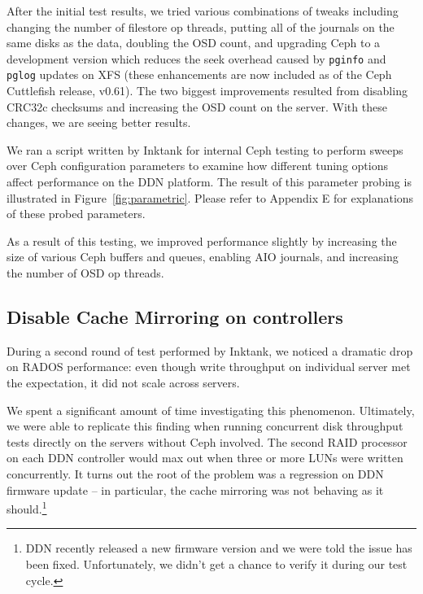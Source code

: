 \documentclass{article}
\begin{document}
After the initial test results, we tried various combinations of tweaks
including changing the number of filestore op threads, putting all of the
journals on the same disks as the data, doubling the OSD count, and upgrading
Ceph to a development version which reduces the seek overhead caused by
\texttt{pginfo} and \texttt{pglog} updates on XFS (these enhancements are now
included as of the Ceph Cuttlefish release, v0.61).  The two biggest
improvements resulted from disabling CRC32c checksums and increasing the OSD
count on the server.  With these changes, we are seeing better results.

We ran a script written by Inktank for internal Ceph testing to perform
sweeps over Ceph configuration parameters to examine how different
tuning options affect performance on the DDN platform. The result of this
parameter probing is illustrated in Figure~\ref{fig:parametric}. Please refer
to Appendix E for explanations of these probed parameters.


As a result of this testing, we improved performance slightly by
increasing the size of various Ceph buffers and queues, enabling AIO journals,
and increasing the number of OSD op threads.


\subsection{Disable Cache Mirroring on controllers}

During a second round of test performed by Inktank, we noticed a dramatic drop
on RADOS performance: even though write throughput on individual server met the
expectation, it did not scale across servers.

We spent a significant amount of time
investigating this phenomenon. Ultimately, we were able to replicate this finding
when running concurrent disk throughput tests directly on the servers without
Ceph involved. The second RAID processor on each DDN controller would max out when
three or more LUNs were written concurrently. It turns out the root of the problem
was a regression on DDN firmware update -- in particular, the cache
mirroring was not behaving as it should.\footnote{DDN recently released a new
firmware version and we were told the issue has been fixed. Unfortunately, we didn't get
a chance to verify it during our test cycle.}

\end{document}
